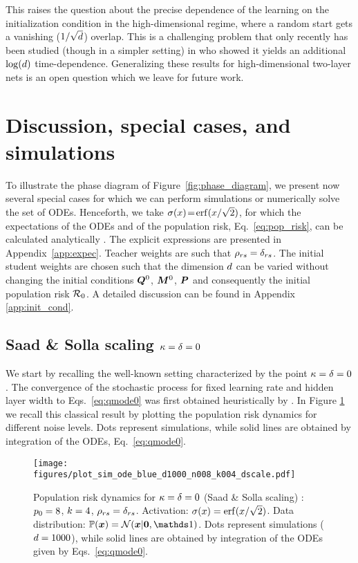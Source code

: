 \documentclass[10pt]{article}
\begin{document}
This raises the question about the precise dependence of the learning on the initialization condition in the high-dimensional regime, where a random start gets a vanishing ($1/\sqrt{\inp}$) overlap. This is a challenging problem that only recently has been studied (though in a simpler setting) in \cite{tan2019phase, arous2021online,arous2020algorithmic} who showed it yields an additional $\log (\inp)$ time-dependence. Generalizing these results for high-dimensional two-layer nets is an open question which we leave for future work.

\section{Discussion, special cases, and simulations}

To illustrate the phase diagram of Figure~\ref{fig:phase_diagram}, we present now several special cases for which we can perform simulations or numerically solve the set of ODEs. Henceforth, we take $\act(x) \!=\! \erf( x / \sqrt{2}  )$, for which the expectations of the ODEs and of the population risk, Eq.~\eqref{eq:pop_risk}, can be calculated analytically \cite{saad_1995}. The explicit expressions are presented in Appendix~\ref{app:expec}. Teacher weights are such that $\p_{rs} = \delta_{rs}$. The initial student weights are chosen such that the dimension $\inp$ can be varied without changing the initial conditions $ \Q^0$, $\M^0$, $\P$ and consequently the initial population risk $\risk_0$. A detailed discussion can be found in Appendix \ref{app:init_cond}.

\subsection{Saad \& Solla scaling \texorpdfstring{$\kap =\del= 0$}{K = D = 0} }
We start by recalling the well-known setting characterized by the point $\kap =\del= 0 $. The convergence of the stochastic process for fixed learning rate and hidden layer width to Eqs.~\eqref{eq:qmode0} was first obtained heuristically by \cite{saad_1995}. In Figure \ref{fig:dscale} we recall this classical result by plotting the population risk dynamics for different noise levels. Dots represent simulations, while solid lines are obtained by integration of the ODEs, Eq.~\eqref{eq:qmode0}.

\begin{figure}[tb!]
\begin{center}
\centerline{\texttt{[image: figures/plot\_sim\_ode\_blue\_d1000\_n008\_k004\_dscale.pdf]}}
\vskip -0.05in
\caption{ Population risk dynamics for $\kap=\del=0$ (Saad \& Solla scaling) : $\hids_0 = 8$, $\hidt=4$, $\prs = \delta_{rs}$. Activation: $\act(x) = \erf(x/\sqrt{2})$. Data distribution: $\Prob (\x) =  \gauss(\x | \bm{0}, \Id )$. Dots represent simulations ($\inp = 1000$), while solid lines are obtained by integration of the ODEs given by Eqs.~\eqref{eq:qmode0}.}
\label{fig:dscale}
\end{center}
\vskip -0.2in
\end{figure}
\end{document}
